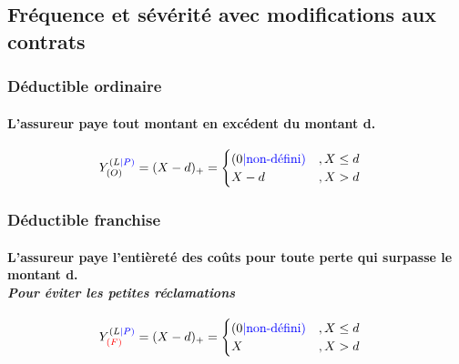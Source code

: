 \documentclass[10pt, french]{article}
\begin{document}
\begin{multicols*}{3}
\setcounter{section}{7}
\section{Fréquence et sévérité avec modifications aux contrats}

\subsubsection*{Déductible ordinaire}

\paragraph{L'assureur paye tout montant en excédent du montant d.}
\begin{align*}
Y^{(L\textcolor{blue}{|P)}}_{(O)} &= (X-d)_+ = 
	\begin{cases}
		(0 {\color{blue}{| \text{non-défini})}}		& , X \leq d \\
		X - d	& , X > d \\
	\end{cases} 
\end{align*}

\subsubsection*{Déductible franchise}
\paragraph{L'assureur paye l'entièreté des coûts pour toute perte qui surpasse le montant d.\\ \textit{Pour éviter les petites réclamations}}
\begin{align*}
Y^{(L\textcolor{blue}{|P)}}_{\color{red}{(F)}} &= (X-d)_+ = 
	\begin{cases}
		(0 {\color{blue}{| \text{non-défini})}}		& , X \leq d \\
		X		& , X > d \\
	\end{cases} 
\end{align*}


\end{multicols*}
\end{document}
